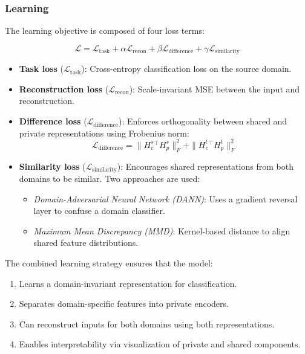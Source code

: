 \documentclass{article}
\begin{document}
\subsubsection{Learning}

The learning objective is composed of four loss terms:

\begin{equation}
\mathcal{L} = \mathcal{L}_{\text{task}} + \alpha \mathcal{L}_{\text{recon}} + \beta \mathcal{L}_{\text{difference}} + \gamma \mathcal{L}_{\text{similarity}}
\end{equation}

\begin{itemize}
    \item \textbf{Task loss} (\( \mathcal{L}_{\text{task}} \)): Cross-entropy classification loss on the source domain.
    \item \textbf{Reconstruction loss} (\( \mathcal{L}_{\text{recon}} \)): Scale-invariant MSE between the input and reconstruction.
    \item \textbf{Difference loss} (\( \mathcal{L}_{\text{difference}} \)): Enforces orthogonality between shared and private representations using Frobenius norm:
    \[
    \mathcal{L}_{\text{difference}} = \| H_c^s{}^{\top} H_p^s \|_F^2 + \| H_c^t{}^{\top} H_p^t \|_F^2
    \]
    \item \textbf{Similarity loss} (\( \mathcal{L}_{\text{similarity}} \)): Encourages shared representations from both domains to be similar. Two approaches are used:
    \begin{itemize}
        \item \textit{Domain-Adversarial Neural Network (DANN)}: Uses a gradient reversal layer to confuse a domain classifier.
        \item \textit{Maximum Mean Discrepancy (MMD)}: Kernel-based distance to align shared feature distributions.
    \end{itemize}
\end{itemize}

The combined learning strategy ensures that the model:
\begin{enumerate}
    \item Learns a domain-invariant representation for classification.
    \item Separates domain-specific features into private encoders.
    \item Can reconstruct inputs for both domains using both representations.
    \item Enables interpretability via visualization of private and shared components.
\end{enumerate}
\end{document}
